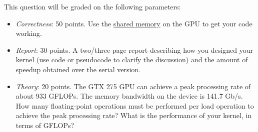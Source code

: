 \documentclass[12.0pt]{article}
\begin{document}
\noindent This question will be graded on the following parameters:
\begin{itemize}
\item \emph{Correctness}: 50 points. Use the \underline{shared memory} on the GPU to get your code working.

\item \emph{Report}: 30 points. A two/three page report describing how you designed your kernel (use code or pseudocode to clarify the discussion) and the amount of speedup obtained over the serial version.

\item \emph{Theory}: 20 points. The GTX 275 GPU can achieve a peak processing rate of about 933 GFLOPs. The memory bandwidth on the device is 141.7 Gb/s. How many floating-point operations must be performed per load operation to achieve the peak processing rate? What is the performance of your kernel, in terms of GFLOPs?
\end{itemize}
\pagebreak
\end{document}
